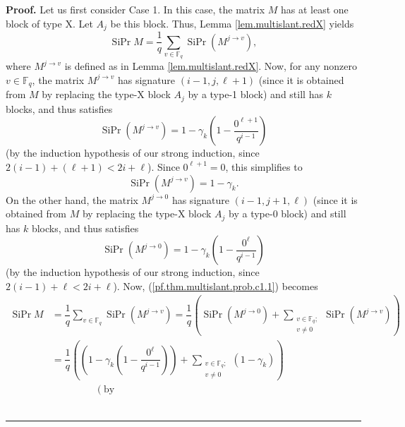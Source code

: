 \documentclass[numbers=enddot,12pt,final,onecolumn,notitlepage]{scrartcl}%
\theoremstyle{definition}
\newenvironment{proof}[1][Proof]{\noindent\textbf{#1.} }{\ \rule{0.5em}{0.5em}}
\let\sumnonlimits\sum
\renewcommand{\sum}{\sumnonlimits\limits}
\newcommand{\Fq}{\mathbb{F}_q}
\theoremstyle{plainsl}
\begin{document}
\begin{proof}
Let us first consider Case 1. In this case, the matrix $M$ has at least one
block of type X. Let $A_{j}$ be this block. Thus, Lemma
\ref{lem.multislant.redX} yields%
\begin{equation}
\operatorname*{SiPr}M=\dfrac{1}{q}\sum_{v\in \Fq}\operatorname*{SiPr}\left(
M^{j\rightarrow v}\right)  , \label{pf.thm.multislant.prob.c1.1}%
\end{equation}
where $M^{j\rightarrow v}$ is defined as in Lemma \ref{lem.multislant.redX}.
Now, for any nonzero $v\in \Fq$, the matrix $M^{j\rightarrow v}$ has signature
$\left(  i-1,j,\ell+1\right)  $ (since it is obtained from $M$ by replacing
the type-X block $A_{j}$ by a type-1 block) and still has $k$ blocks, and thus
satisfies%
\[
\operatorname*{SiPr}\left(  M^{j\rightarrow v}\right)  =1-\gamma_{k}\left(
1-\dfrac{0^{\ell+1}}{q^{i-1}}\right)
\]
(by the induction hypothesis of our strong induction, since $2\left(
i-1\right)  +\left(  \ell+1\right)  <2i+\ell$). Since $0^{\ell+1}=0$, this
simplifies to%
\begin{equation}
\operatorname*{SiPr}\left(  M^{j\rightarrow v}\right)  =1-\gamma_{k}.
\label{pf.thm.multislant.prob.c1.2}%
\end{equation}
On the other hand, the matrix $M^{j\rightarrow0}$ has signature $\left(
i-1,j+1,\ell\right)  $ (since it is obtained from $M$ by replacing the type-X
block $A_{j}$ by a type-0 block) and still has $k$ blocks, and thus satisfies%
\begin{equation}
\operatorname*{SiPr}\left(  M^{j\rightarrow0}\right)  =1-\gamma_{k}\left(
1-\dfrac{0^{\ell}}{q^{i-1}}\right)  \label{pf.thm.multislant.prob.c1.3}%
\end{equation}
(by the induction hypothesis of our strong induction, since $2\left(
i-1\right)  +\ell<2i+\ell$). Now, (\ref{pf.thm.multislant.prob.c1.1}) becomes%
\begin{align*}
\operatorname*{SiPr}M  &  =\dfrac{1}{q}\sum_{v\in \Fq}\operatorname*{SiPr}%
\left(  M^{j\rightarrow v}\right)  =\dfrac{1}{q}\left(  \operatorname*{SiPr}%
\left(  M^{j\rightarrow0}\right)  +\sum_{\substack{v\in \Fq;\\v\neq
0}}\operatorname*{SiPr}\left(  M^{j\rightarrow v}\right)  \right) \\
&  =\dfrac{1}{q}\left(  \left(  1-\gamma_{k}\left(  1-\dfrac{0^{\ell}}%
{q^{i-1}}\right)  \right)  +\sum_{\substack{v\in \Fq;\\v\neq0}}\left(
1-\gamma_{k}\right)  \right) \\
&  \ \ \ \ \ \ \ \ \ \ \ \ \ \ \ \ \ \ \ \ \left(  \text{by
}
\end{align*}
\end{proof}
\end{document}

